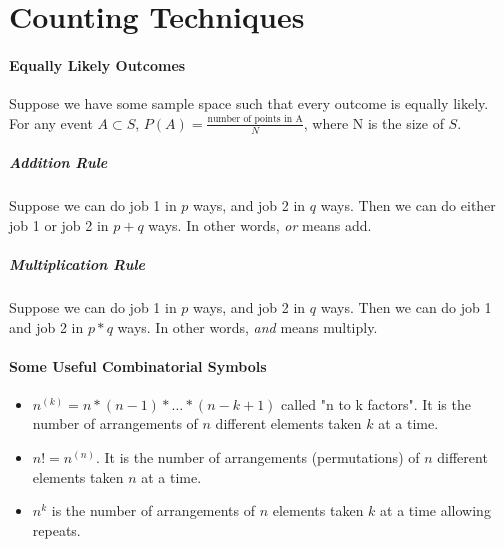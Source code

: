 \documentclass[10pt,letter]{article}
\begin{document}
\section*{Counting Techniques}
\paragraph{Equally Likely Outcomes}
Suppose we have some sample space such that every outcome is equally likely. For any event $A\subset S$, $P(A)=\frac{\text{number of points in A}}{N}$, where N is the size of $S$. 
\subparagraph{Addition Rule}
Suppose we can do job 1 in $p$ ways, and job 2 in $q$ ways. Then we can do either job 1 or job 2 in $p+q$ ways. In other words, \textit{or} means add. 
\subparagraph{Multiplication Rule}
Suppose we can do job 1 in $p$ ways, and job 2 in $q$ ways. Then we can do job 1 and job 2 in $p*q$ ways. In other words, \textit{and} means multiply. 

\paragraph{Some Useful Combinatorial Symbols}
\begin{itemize}
    \item $n^{(k)} = n*(n-1)*\ldots * (n-k+1)$ called "n to k factors". It is the number of arrangements of $n$ different elements taken $k$ at a time. 
    \item $n!=n^{(n)}$. It is the number of arrangements (permutations) of $n$ different elements taken $n$ at a time.
    \item $n^k$ is the number of arrangements of $n$ elements taken $k$ at a time allowing repeats.
\end{itemize}
\end{document}
